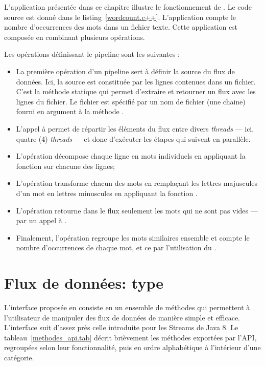L'application  pr\'esent\'ee dans ce chapitre illustre le fonctionnement de . Le code source est donn\'e dans le listing~\ref{wordcount.c++}. L'application compte le nombre d'occurrences des mots dans un fichier texte. Cette application est compos\'ee en combinant plusieurs op\'erations.


Les op\'erations d\'efinissant le pipeline sont les suivantes :
\begin{itemize}

\item  La premi\`ere op\'eration d'un pipeline sert \`a d\'efinir la source du flux de donn\'ees. Ici, la source est
constitu\'ee par les lignes contenues dans un fichier. C'est la
m\'ethode statique  qui permet d'extraire et retourner un
flux avec les lignes du fichier. Le fichier est sp\'ecifi\'e par un nom de fichier
(une chaine) fourni en argument \`a la m\'ethode
.


\item L'appel \`a  permet de r\'epartir les \'el\'ements du flux entre divers \emph{threads} --- ici, quatre (4) \emph{threads} --- et donc d'ex\'ecuter les \'etapes qui suivent en parall\`ele. 



\item L'op\'eration  d\'ecompose chaque ligne en mots individuels en appliquant la fonction  sur chacune des lignes;

\item L'op\'eration  transforme chacun des mots en rempla\c{c}ant les lettres majuscules d'un mot en lettres minuscules en appliquant la fonction .

\item L'op\'eration  retourne dans le flux seulement les mots qui ne sont pas vides --- par un appel \`a .

\item Finalement, l'op\'eration   regroupe les mots similaires ensemble et compte le nombre d'occurrences de chaque mot, et ce par l'utilisation du  . 
\end{itemize}


\section{Flux de donn\'ees: type }

L'interface propos\'ee en  consiste en un ensemble de m\'ethodes qui permettent \`a l'utilisateur de manipuler des flux de donn\'ees de mani\`ere simple et efficace. L'interface suit d'assez pr\`es celle introduite pour les Streams de Java 8. Le tableau~\ref{methodes_api.tab} d\'ecrit bri\`evement les m\'ethodes export\'ees par l'API, regroup\'ees selon leur fonctionnalit\'e, puis en ordre alphab\'etique \`a l'int\'erieur d'une cat\'egorie.


